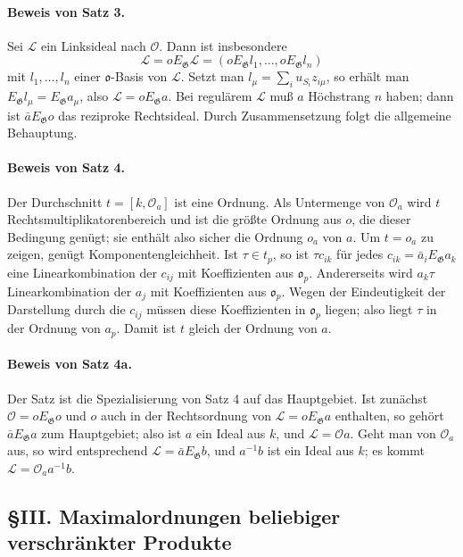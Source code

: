 \documentclass[11pt]{article}
\providecommand{\Gg}{\mathfrak G}
\providecommand{\oo}{\mathfrak o}
\begin{document}
\paragraph{Beweis von Satz 3.}
Sei \(\mathcal L\) ein Linksideal nach \(\mathcal O\). Dann ist insbesondere
\[
        \mathcal L=oE_\Gg\mathcal L
        =(oE_\Gg l_1,\ldots,oE_\Gg l_n)
\]
mit \(l_1,\ldots,l_n\) einer \(\oo\)-Basis von \(\mathcal L\). Setzt man \(l_\mu=\sum_i u_{S_i}z_{i\mu}\), so erhält man \(E_\Gg l_\mu=E_\Gg a_\mu\), also \(\mathcal L=oE_\Gg a\). Bei regulärem \(\mathcal L\) muß \(a\) Höchstrang \(n\) haben; dann ist \(\bar aE_\Gg o\) das reziproke Rechtsideal. Durch Zusammensetzung folgt die allgemeine Behauptung.

\paragraph{Beweis von Satz 4.}
Der Durchschnitt \(t=[k,\mathcal O_a]\) ist eine Ordnung. Als Untermenge von \(\mathcal O_a\) wird \(t\) Rechtsmultiplikatorenbereich und ist die größte Ordnung aus \(o\), die dieser Bedingung genügt; sie enthält also sicher die Ordnung \(o_a\) von \(a\). Um \(t=o_a\) zu zeigen, genügt Komponentengleichheit. Ist \(\tau\in t_p\), so ist \(\tau c_{ik}\) für jedes \(c_{ik}=\bar a_iE_\Gg a_k\) eine Linearkombination der \(c_{ij}\) mit Koeffizienten aus \(\oo_p\). Andererseits wird \(a_k\tau\) Linearkombination der \(a_j\) mit Koeffizienten aus \(\oo_p\). Wegen der Eindeutigkeit der Darstellung durch die \(c_{ij}\) müssen diese Koeffizienten in \(\oo_p\) liegen; also liegt \(\tau\) in der Ordnung von \(a_p\). Damit ist \(t\) gleich der Ordnung von \(a\).

\paragraph{Beweis von Satz 4a.}
Der Satz ist die Spezialisierung von Satz 4 auf das Hauptgebiet. Ist zunächst \(\mathcal O=oE_\Gg o\) und \(o\) auch in der Rechtsordnung von \(\mathcal L=oE_\Gg a\) enthalten, so gehört \(\bar aE_\Gg a\) zum Hauptgebiet; also ist \(a\) ein Ideal aus \(k\), und \(\mathcal L=\mathcal O a\). Geht man von \(\mathcal O_a\) aus, so wird entsprechend \(\mathcal L=\bar aE_\Gg b\), und \(a^{-1}b\) ist ein Ideal aus \(k\); es kommt \(\mathcal L=\mathcal O_a a^{-1}b\).

\subsection*{§III. Maximalordnungen beliebiger verschränkter Produkte}
\end{document}
